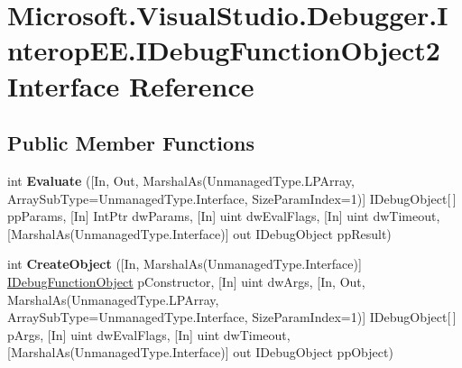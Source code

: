 \hypertarget{interface_microsoft_1_1_visual_studio_1_1_debugger_1_1_interop_e_e_1_1_i_debug_function_object2}{\section{Microsoft.\+Visual\+Studio.\+Debugger.\+Interop\+E\+E.\+I\+Debug\+Function\+Object2 Interface Reference}
\label{interface_microsoft_1_1_visual_studio_1_1_debugger_1_1_interop_e_e_1_1_i_debug_function_object2}
}
\subsection*{Public Member Functions}
\begin{DoxyCompactItemize}
\item 
\hypertarget{interface_microsoft_1_1_visual_studio_1_1_debugger_1_1_interop_e_e_1_1_i_debug_function_object2_a763bdf42e19c8d5dd1d50b20ba3d5c97}{int {\bfseries Evaluate} (\mbox{[}In, Out, Marshal\+As(Unmanaged\+Type.\+L\+P\+Array, Array\+Sub\+Type=Unmanaged\+Type.\+Interface, Size\+Param\+Index=1)\mbox{]} I\+Debug\+Object\mbox{[}$\,$\mbox{]} pp\+Params, \mbox{[}In\mbox{]} Int\+Ptr dw\+Params, \mbox{[}In\mbox{]} uint dw\+Eval\+Flags, \mbox{[}In\mbox{]} uint dw\+Timeout, \mbox{[}Marshal\+As(Unmanaged\+Type.\+Interface)\mbox{]} out I\+Debug\+Object pp\+Result)}\label{interface_microsoft_1_1_visual_studio_1_1_debugger_1_1_interop_e_e_1_1_i_debug_function_object2_a763bdf42e19c8d5dd1d50b20ba3d5c97}

\item 
\hypertarget{interface_microsoft_1_1_visual_studio_1_1_debugger_1_1_interop_e_e_1_1_i_debug_function_object2_a7fb8285a7a8eb54d94bf35ce91e6ae4c}{int {\bfseries Create\+Object} (\mbox{[}In, Marshal\+As(Unmanaged\+Type.\+Interface)\mbox{]} \hyperlink{interface_microsoft_1_1_visual_studio_1_1_debugger_1_1_interop_e_e_1_1_i_debug_function_object}{I\+Debug\+Function\+Object} p\+Constructor, \mbox{[}In\mbox{]} uint dw\+Args, \mbox{[}In, Out, Marshal\+As(Unmanaged\+Type.\+L\+P\+Array, Array\+Sub\+Type=Unmanaged\+Type.\+Interface, Size\+Param\+Index=1)\mbox{]} I\+Debug\+Object\mbox{[}$\,$\mbox{]} p\+Args, \mbox{[}In\mbox{]} uint dw\+Eval\+Flags, \mbox{[}In\mbox{]} uint dw\+Timeout, \mbox{[}Marshal\+As(Unmanaged\+Type.\+Interface)\mbox{]} out I\+Debug\+Object pp\+Object)}\label{interface_microsoft_1_1_visual_studio_1_1_debugger_1_1_interop_e_e_1_1_i_debug_function_object2_a7fb8285a7a8eb54d94bf35ce91e6ae4c}


\end{DoxyCompactItemize}
